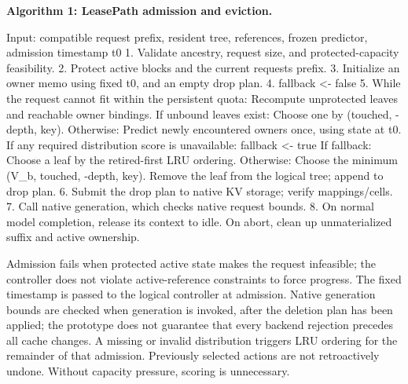 \documentclass[
  english,
  10pt,
]{article}
\newenvironment{Shaded}{}{}
\newcommand{\NormalTok}[1]{#1}
\begin{document}

\textbf{Algorithm 1: LeasePath admission and eviction.}

\begin{Shaded}
\begin{Highlighting}[]
\NormalTok{Input: compatible request prefix, resident tree, references,}
\NormalTok{       frozen predictor, admission timestamp t0}
\NormalTok{1. Validate ancestry, request size, and protected{-}capacity feasibility.}
\NormalTok{2. Protect active blocks and the current request\textquotesingle{}s prefix.}
\NormalTok{3. Initialize an owner memo using fixed t0, and an empty drop plan.}
\NormalTok{4. fallback \textless{}{-} false}
\NormalTok{5. While the request cannot fit within the persistent quota:}
\NormalTok{     Recompute unprotected leaves and reachable owner bindings.}
\NormalTok{     If unbound leaves exist:}
\NormalTok{         Choose one by (touched, {-}depth, key).}
\NormalTok{     Otherwise:}
\NormalTok{         Predict newly encountered owners once, using state at t0.}
\NormalTok{         If any required distribution score is unavailable:}
\NormalTok{             fallback \textless{}{-} true}
\NormalTok{         If fallback:}
\NormalTok{             Choose a leaf by the retired{-}first LRU ordering.}
\NormalTok{         Otherwise:}
\NormalTok{             Choose the minimum (V\_b, touched, {-}depth, key).}
\NormalTok{     Remove the leaf from the logical tree; append to drop plan.}
\NormalTok{6. Submit the drop plan to native KV storage; verify mappings/cells.}
\NormalTok{7. Call native generation, which checks native request bounds.}
\NormalTok{8. On normal model completion, release its context to idle.}
\NormalTok{   On abort, clean up unmaterialized suffix and active ownership.}
\end{Highlighting}
\end{Shaded}

Admission fails when protected active state makes the request
infeasible; the controller does not violate active-reference constraints
to force progress. The fixed timestamp is passed to the logical
controller at admission. Native generation bounds are checked when
generation is invoked, after the deletion plan has been applied; the
prototype does not guarantee that every backend rejection precedes all
cache changes. A missing or invalid distribution triggers LRU ordering
for the remainder of that admission. Previously selected actions are not
retroactively undone. Without capacity pressure, scoring is unnecessary.
\end{document}
